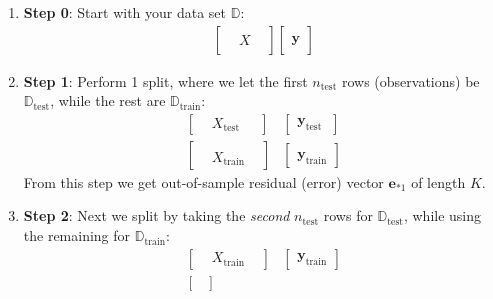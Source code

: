 \documentclass[12pt, a4paper]{article}
\theoremstyle{definition}
\begin{document}
	\begin{enumerate}[label=(\alph*)]
		\item \textbf{Step 0}: Start with your data set $\mathbb{D}$:
		\begin{align*}
			\begin{bmatrix}
				{} & {} & {}\\
				{} & X & {}\\
				{} &   & {}
			\end{bmatrix}
			\begin{bmatrix}
				{}\\
				\mathbf{y}\\
				{}
			\end{bmatrix}
		\end{align*}
		\item \textbf{Step 1}: Perform 1 split, where we let the first
		$n_{\text{test}}$ rows (observations) be $\mathbb{D}_{\text{test}}$, while the
		rest are $\mathbb{D}_{\text{train}}$:
		\begin{align*}
			\begin{bmatrix}
				{} & X_{\text{test\ \  }} & {}
			\end{bmatrix}
			&
			\begin{bmatrix}
				\mathbf{y}_{\text{test\ \ }}
			\end{bmatrix}\\
			\begin{bmatrix}
				{} & {} & {}\\
				{} & X_{\text{train}} & {}
			\end{bmatrix}
			&
			\begin{bmatrix}
				{}\\
				\mathbf{y}_{\text{train}}
			\end{bmatrix}
		\end{align*}
		From this step we get out-of-sample residual (error) vector $\mathbf{e}_{*1}$
		of length $K$.
		\item \textbf{Step 2}: Next we split by taking the \textit{second} $n_{\text{test}}$
		rows for $\mathbb{D}_{\text{test}}$, while using the remaining for $\mathbb{D}_{\text{train}}$:
		\begin{align*}
			\begin{bmatrix}
				{} & X_{\text{train}} & {}
			\end{bmatrix}
			&
			\begin{bmatrix}
				\mathbf{y}_{\text{train}}
			\end{bmatrix}\\
			\begin{bmatrix}

\end{bmatrix}
\end{align*}
\end{enumerate}
\end{document}
